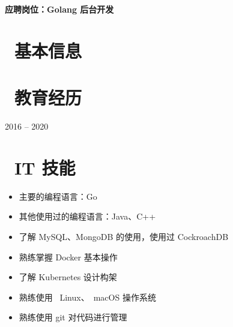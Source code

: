 \documentclass{resume}
\begin{document}

  \hfill \vspace{2mm} \par
\textbf{应聘岗位：Golang 后台开发}

\section{\faInfo\ 基本信息} \vspace{1mm}

{\phone {} \qquad\qquad\quad
	\email {}
	\vspace{2mm} \par
	\github {} \qquad
	\faLink {}}

\section{\faGraduationCap\ 教育经历} \vspace{1mm}

{2016 -- 2020}

\section{\faCogs\ IT 技能} \vspace{1mm}

\begin{itemize}[parsep=1ex]
	\item 主要的编程语言：Go
	\item 其他使用过的编程语言：Java、C++
	\item 了解 MySQL、MongoDB 的使⽤，使用过 CockroachDB
	\item 熟练掌握 Docker 基本操作
	\item 了解 Kubernetes 设计构架
	\item 熟练使⽤ \faLinux\ {Linux}、\faApple\ {macOS} 操作系统
	\item 熟练使用 git 对代码进行管理
\end{itemize}
\end{document}
